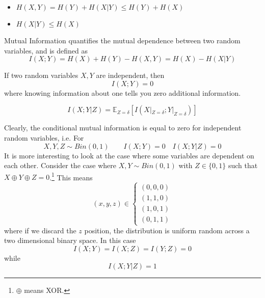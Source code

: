 \begin{proposition}
	\begin{itemize}
		\item $H(X, Y) = H(Y) + H(X | Y) \leq H(Y) + H(X)$
		\item $H(X | Y) \leq H(X)$
	\end{itemize}
\end{proposition}

\begin{definition}
	Mutual Information quantifies the mutual dependence between two random variables, and is defined as
	\begin{equation}
		I(X;Y) = H(X) + H(Y) - H(X, Y) = H(X) - H(X | Y)
	\end{equation}
\end{definition}

\begin{proposition}
	If two random variables $X, Y$ are independent, then
	\begin{equation}
		I(X;Y) = 0
	\end{equation}
	where knowing information about one tells you zero additional information. 
\end{proposition}

\begin{definition}
	\begin{equation}
		I(X;Y|Z) = \mathbb E _{Z = \delta} [I (X|_{Z = \delta} ; Y|_{Z = \delta} )]
	\end{equation}
\end{definition}

Clearly, the conditional mutual information is equal to zero for independent random variables, i.e. For
\begin{equation}
	X, Y, Z \sim Bin(0, 1) \quad \quad I(X;Y) = 0 \quad I(X;Y|Z) = 0
\end{equation}
It is more interesting to look at the case where some variables are dependent on each other. Consider the case where $X, Y \sim Bin(0, 1)$ with $Z \in \{0,1\}$ such that $X \oplus Y \oplus Z = 0$.\footnote{
	$\oplus$ means XOR.
} This means
\begin{equation}
	(x,y,z) \in \begin{cases}
		(0,0,0) \\
		(1,1,0) \\
		(1,0,1) \\
		(0,1,1) 
	\end{cases}
\end{equation}
where if we discard the $z$ position, the distribution is uniform random across a two dimensional binary space. In this case
\begin{equation}
	I(X;Y) = I(X;Z) = I(Y;Z) = 0
\end{equation}
while 
\begin{equation}
	I(X;Y|Z) = 1
\end{equation}

